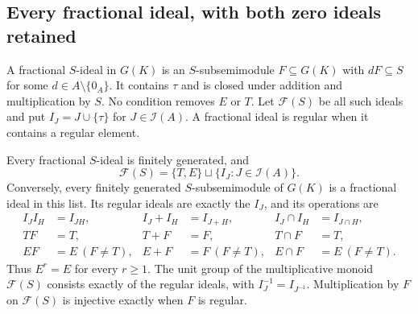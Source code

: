 \subsection{Every fractional ideal, with both zero ideals retained}

\begin{definition}
A fractional \(S\)-ideal in \(G(K)\) is an \(S\)-subsemimodule
\(F\subseteq G(K)\) with \(dF\subseteq S\) for some
\(d\in A\setminus\{0_A\}\). It contains \(\tau\) and is closed under
addition and multiplication by \(S\). No condition removes \(E\)
or \(T\). Let \(\mathcal F(S)\) be all such ideals and put
\(I_J=J\cup\{\tau\}\) for \(J\in\mathcal I(A)\).
A fractional ideal is regular when it contains a regular element.
\end{definition}

\begin{theorem}\label{thm:sz-all-fractional}
Every fractional \(S\)-ideal is finitely generated, and
\begin{equation}\label{eq:sz-all-fractional}
 \mathcal F(S)=\{T,E\}\sqcup\{I_J:J\in\mathcal I(A)\}.
\end{equation}
Conversely, every finitely generated \(S\)-subsemimodule of \(G(K)\)
is a fractional ideal in this list.
Its regular ideals are exactly the \(I_J\), and its operations are
\begin{align}
 I_JI_H&=I_{JH},&
 I_J+I_H&=I_{J+H},&
 I_J\cap I_H&=I_{J\cap H}, \label{eq:sz-ideal-operations}\\
 TF&=T,& T+F&=F,&T\cap F&=T, \label{eq:sz-absent-ideal}\\
 EF&=E\ (F\ne T),&
 E+F&=F\ (F\ne T),&
 E\cap F&=E\ (F\ne T). \label{eq:sz-supported-ideal}
\end{align}
Thus \(E^r=E\) for every \(r\ge1\). The unit group of the
multiplicative monoid \(\mathcal F(S)\) consists exactly of the
regular ideals, with \(I_J^{-1}=I_{J^{-1}}\).
Multiplication by \(F\) on \(\mathcal F(S)\) is injective exactly
when \(F\) is regular.
\end{theorem}
